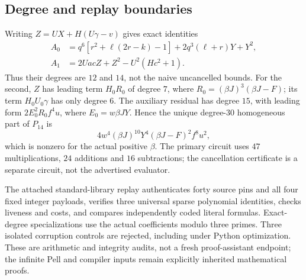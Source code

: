 \subsection{Degree and replay boundaries}
Writing $Z=UX+H(U\gamma-v)$ gives exact identities
\begin{align*}
 A_0&=q^6[r^2+\ell(2r-k)-1]+2q^3(\ell+r)Y+Y^2,\\
 A_1&=2UacZ+Z^2-U^2(Hc^2+1).
\end{align*}
Thus their degrees are $12$ and $14$, not the naive uncancelled bounds.
For the second, $Z$ has leading term $H_0R_0$ of degree $7$, where
$R_0=(\beta J)^3(\beta J-F)$; its term $H_0U_0\gamma$ has only degree $6$.
The auxiliary residual has degree $15$, with leading form
$2E_0^2R_0f^4u$, where $E_0=w\beta JY$.
Hence the unique degree-$30$ homogeneous part of $P_{14}$ is
\[
 4w^4(\beta J)^{10}Y^4(\beta J-F)^2 f^8u^2,
\]
which is nonzero for the actual positive $\beta$.
The primary circuit uses $47$ multiplications, $24$ additions and
$16$ subtractions; the cancellation certificate is a separate circuit,
not the advertised evaluator.

The attached standard-library replay authenticates forty source pins and
all four fixed integer payloads, verifies three universal sparse polynomial
identities, checks liveness and costs, and compares independently coded
literal formulas. Exact-degree specializations use the actual coefficients
modulo three primes. Three isolated corruption controls are rejected,
including under Python optimization. These are arithmetic and integrity
audits, not a fresh proof-assistant endpoint; the infinite Pell and compiler
inputs remain explicitly inherited mathematical proofs.
